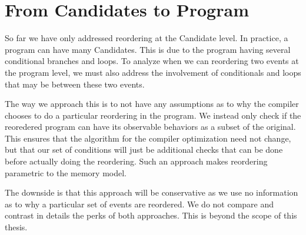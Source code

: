 \section{From Candidates to Program}

    So far we have only addressed reordering at the Candidate level. In practice, a program can have many Candidates. This is due to the program having several conditional branches and loops. To analyze when we can reordering two events at the program level, we must also address the involvement of conditionals and loops that may be between these two events.
    
    The way we approach this is to not have any assumptions as to why the compiler chooses to do a particular reordering in the program. 
    We instead only check if the reoredered program can have its observable behaviors as a subset of the original. This ensures that the algorithm for the compiler optimization need not change, but that our set of conditions will just be additional checks that can be done before actually doing the reordering. Such an approach makes reordering parametric to the memory model. 

    The downside is that this approach will be conservative as we use no information as to why a particular set of events are reordered. We do not compare and contrast in details the perks of both approaches. This is beyond the scope of this thesis.
    
    

    

    